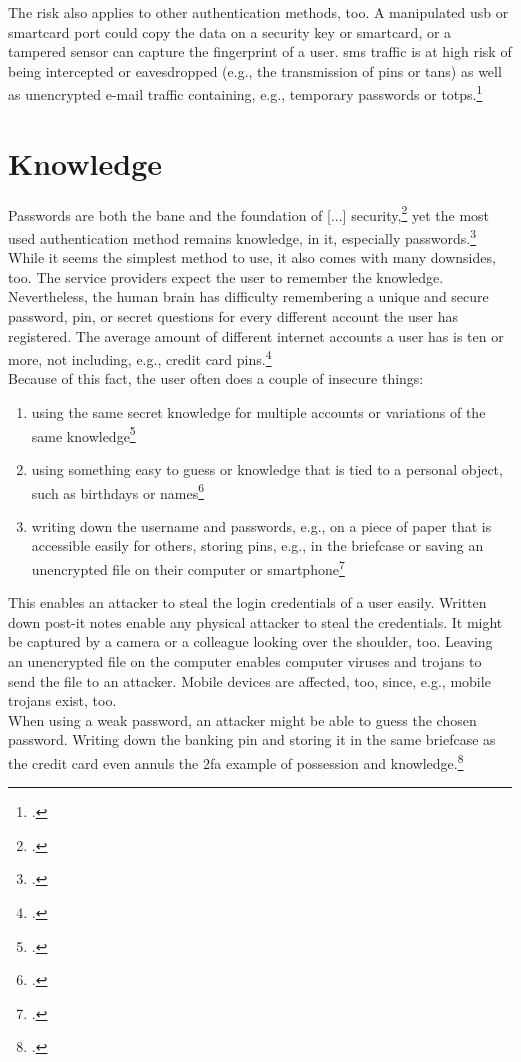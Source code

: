 The risk also applies to other authentication methods, too. A manipulated \gls{usb} or smartcard port could copy the data on a security key or smartcard, or a tampered sensor can capture the fingerprint of a user. \gls{sms} traffic is at high risk of being intercepted or eavesdropped (e.g., the transmission of \glspl{pin} or \glspl{tan}) as well as unencrypted e-mail traffic containing, e.g., temporary passwords or \glspl{totp}.\footcites[See][103]{2241278}[See][58]{dotson2019practical}[See][6]{1698485}


\section{Knowledge}

\frqq Passwords are both the bane and the foundation of [...] security\flqq{},\footcite[206]{517355} yet the most used authentication method remains knowledge, in \gls{it}, especially passwords.\footcite[See][424]{320284} While it seems the simplest method to use, it also comes with many downsides, too. The service providers expect the user to remember the knowledge. Nevertheless, the human brain has difficulty remembering a unique and secure password, \gls{pin}, or secret questions for every different account the user has registered. The average amount of different internet accounts a user has is ten or more, not including, e.g., credit card \glspl{pin}.\footcites[See][7, 9]{lastpass}\\
Because of this fact, the user often does a couple of insecure things:

\begin{enumerate}[label=(\alph*)]
	\item using the same secret knowledge for multiple accounts or variations of the same knowledge\footcites[See][8]{yougov}[See][14]{sweden-passwords}[See][7]{lastpass}
	\item using something easy to guess or knowledge that is tied to a personal object, such as birthdays or names\footcites[See][]{web-de-passwords}[See][34]{anderson2008security}
	\item writing down the username and passwords, e.g., on a piece of paper that is accessible easily for others, storing \glspl{pin}, e.g., in the briefcase or saving an unencrypted file on their computer or smartphone\footcites[See][]{web-de-passwords}[See][6]{yougov2}

\end{enumerate}

This enables an attacker to steal the login credentials of a user easily. Written down post-it notes enable any physical attacker to steal the credentials. It might be captured by a camera or a colleague looking over the shoulder, too. Leaving an unencrypted file on the computer enables computer viruses and trojans to send the file to an attacker. Mobile devices are affected, too, since, e.g., mobile trojans exist, too.\\
When using a weak password, an attacker might be able to guess the chosen password. Writing down the banking \gls{pin} and storing it in the same briefcase as the credit card even annuls the \gls{2fa} example of possession and knowledge.\footcites[See][Chapter 4.1]{kissell2019take}

